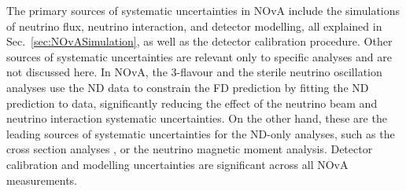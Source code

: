 The primary sources of systematic uncertainties in \gls{NOvA} include the simulations of neutrino flux, neutrino interaction, and detector modelling, all explained in Sec.~\ref{sec:NOvASimulation}, as well as the detector calibration procedure. Other sources of systematic uncertainties are relevant only to specific analyses and are not discussed here. In \gls{NOvA}, the 3-flavour \cite{NOvAResults2021.pdf} and the sterile \cite{NOvASterilesFHCRHCResults2021.pdf} neutrino oscillation analyses use the \gls{ND} data to constrain the \gls{FD} prediction by fitting the \gls{ND} prediction to data, significantly reducing the effect of the neutrino beam and neutrino interaction systematic uncertainties. On the other hand, these are the leading sources of systematic uncertainties for the \gls{ND}-only analyses, such as the cross section analyses \cite{NOvANCPi0XSecMeasurement2019.pdf, NOvANumuCCXSexMeasurement2023.pdf, NOvANueCCXSecMeasurement2023.pdf, NOvANuMuCCPi0XSecMeasurement2023.pdf}, or the neutrino magnetic moment analysis. Detector calibration and modelling uncertainties are significant across all \gls{NOvA} measurements.





